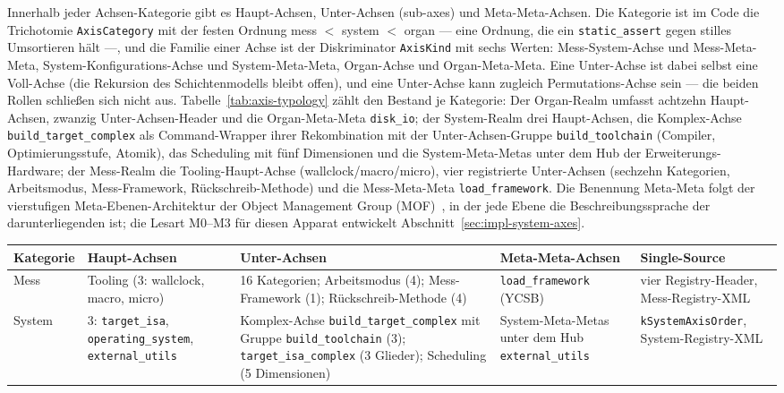 \begin{nurlang}
Innerhalb jeder Achsen-Kategorie gibt es Haupt-Achsen, Unter-Achsen (sub-axes) und Meta-Meta-Achsen. Die
Kategorie ist im Code die Trichotomie \texttt{AxisCategory} mit der festen Ordnung mess $<$ system $<$
organ --- eine Ordnung, die ein \texttt{static\_assert} gegen stilles Umsortieren hält ---, und die
Familie einer Achse ist der Diskriminator \texttt{AxisKind} mit sechs Werten: Mess-System-Achse und
Mess-Meta-Meta, System-Konfigurations-Achse und System-Meta-Meta, Organ-Achse und Organ-Meta-Meta. Eine
Unter-Achse ist dabei selbst eine Voll-Achse (die Rekursion des Schichtenmodells bleibt offen), und eine
Unter-Achse kann zugleich Permutations-Achse sein --- die beiden Rollen schließen sich nicht aus.
Tabelle~\ref{tab:axis-typology} zählt den Bestand je Kategorie: Der Organ-Realm umfasst achtzehn
Haupt-Achsen, zwanzig Unter-Achsen-Header und die Organ-Meta-Meta \texttt{disk\_io}; der System-Realm drei
Haupt-Achsen, die Komplex-Achse \texttt{build\_target\_complex} als Command-Wrapper ihrer Rekombination mit
der Unter-Achsen-Gruppe \texttt{build\_toolchain} (Compiler, Optimierungsstufe, Atomik), das Scheduling
mit fünf Dimensionen und die System-Meta-Metas unter dem Hub der Erweiterungs-Hardware; der Mess-Realm
die Tooling-Haupt-Achse (wallclock/macro/micro), vier registrierte Unter-Achsen (sechzehn Kategorien,
Arbeitsmodus, Mess-Framework, Rückschreib-Methode) und die Mess-Meta-Meta \texttt{load\_framework}. Die
Benennung Meta-Meta folgt der vierstufigen Meta-Ebenen-Architektur der Object Management Group
(MOF)~\cite{omg2016mof}, in der jede Ebene die Beschreibungssprache der darunterliegenden ist; die Lesart
M0--M3 für diesen Apparat entwickelt Abschnitt~\ref{sec:impl-system-axes}.
\begin{table}[htbp]\centering\footnotesize
\begin{tabular}{@{}lp{2.5cm}p{4.4cm}p{2.7cm}p{3.2cm}@{}}
\toprule
Kategorie & Haupt-Achsen & Unter-Achsen & Meta-Meta-Achsen & Single-Source \\
\midrule
Mess & Tooling (3: wallclock, macro, micro) & 16 Kategorien; Arbeitsmodus (4); Mess-Framework (1); Rückschreib-Methode (4) & \texttt{load\_framework} (YCSB) & vier Registry-Header, Mess-Registry-XML \\
System & 3: \texttt{target\_\allowbreak{}isa}, \texttt{operating\_\allowbreak{}system}, \texttt{external\_\allowbreak{}utils} & Komplex-Achse \texttt{build\_target\_complex} mit Gruppe \texttt{build\_toolchain} (3); \texttt{target\_isa\_complex} (3 Glieder); Scheduling (5 Dimensionen) & System-Meta-Metas unter dem Hub \texttt{external\_utils} & \texttt{kSystemAxisOrder}, System-Registry-XML \\

\end{tabular}
\end{table}
\end{nurlang}
